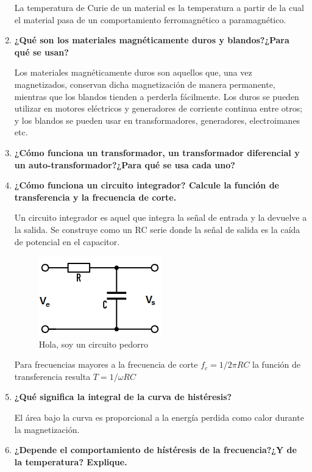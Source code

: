 \documentclass[a4paper,10pt,fleqn,oneside]{article}
\begin{document}
\begin{enumerate}[1.]
	La temperatura de Curie de un material es la temperatura a partir de la cual el material pasa de un comportamiento ferromagnético a paramagnético.
	\item \textbf{¿Qué son los materiales magnéticamente duros y blandos?¿Para qué se usan?}
	
	Los materiales magnéticamente duros son aquellos que, una vez magnetizados, conservan dicha magnetización de manera permanente, mientras que los blandos tienden a perderla fácilmente.
	Los duros se pueden utilizar en motores eléctricos y generadores de corriente continua entre otros; y los blandos se pueden usar en transformadores, generadores, electroimanes etc.
	\item \textbf{¿Cómo funciona un transformador, un transformador diferencial y un auto-transformador?¿Para qué se usa cada uno?}
	\item \textbf{¿Cómo funciona un circuito integrador? Calcule la función de transferencia y la frecuencia de corte.} 
	
	Un circuito integrador es aquel que integra la señal de entrada y la devuelve a la salida. Se construye como un RC serie donde la señal de salida es la caída de potencial en el capacitor. 
	
	\begin{figure}[h]
		\centering
		\includegraphics[scale=0.75]{integrador.png}
		\caption{Hola, soy un circuito pedorro}
		\label{CH}
	\end{figure}
	
	Para frecuencias mayores a la frecuencia de corte $f_c = 1/2\pi RC$ la función de transferencia resulta $T = 1/\omega RC$
	
	\item \textbf{¿Qué significa la integral de la curva de histéresis?}
	
	El área bajo la curva es proporcional a la energía perdida como calor durante la magnetización. 
	\item \textbf{¿Depende el comportamiento de hístéresis de la frecuencia?¿Y de la temperatura? Explique.}
	
\end{enumerate}
\end{document}
